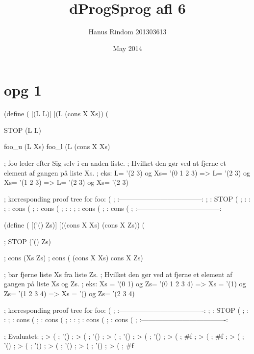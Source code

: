 \documentclass{article}
\title{dProgSprog afl 6}
\author{Hanus Rindom 201303613}
\date{May 2014}
\begin{document}
\maketitle
\section*{opg 1}

(define %
  (%
     [(L L)]
     [(L (cons X Xs))
      (%


STOP 	(L L)

foo_u	(L Xs)
foo_l	(L (cons X Xs)

; foo leder efter Sig selv i en anden liste.
; Hvilket den gør ved at fjerne et element af gangen på liste Xs.
; eks: L= '(2 3) og Xs= '(0 1 2 3) => L= '(2 3) og Xs= '(1 2 3) => L= '(2 3) og Xs= '(2 3)

; korresponding proof tree for foo: (%
;   :------------------------------------:
;	: STOP 	(%
;	:									 :
;	: cons	(%
;	: cons	(%
;	:									 :
;	: cons	(%
;	: cons	(%
;	:------------------------------------:

(define %
  (%
     [('() Zs)]
     [((cons X Xs) (cons X Zs))
      (%

; STOP 	('() Zs)

; cons	(Xs Zs)
; cons	( (cons X Xs) cons X Zs)


; bar fjerne liste Xs fra liste Zs.
; Hvilket den gør ved at fjerne et element af gangen på liste Xs og Zs.
; eks: Xs = '(0 1) og Zs= '(0 1 2 3 4) => Xs = '(1) og Zs= '(1 2 3 4) => Xs = '() og Zs= '(2 3 4)

; korresponding proof tree for foo: (%
;   :-------------------------------------:
;	: STOP 	(%
;	:									  :
;	: cons	(%
;	: cons	(%
;	:									  :
;	: cons	(%
;	: cons	(%
;	:-------------------------------------:

; Evaluatet:
; > (%
; '()
; > (%
; '() 
; > (%
; '() 
; > (%
; '() 
; > (%
; #f
; > (%
; #f
; > (%
; '() 
; > (%
; '() 
; > (%
; '() 
; > (%
; '() 
; > (%
; #f
\end{document}
